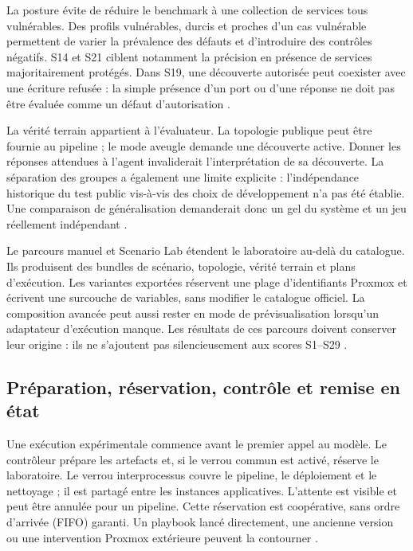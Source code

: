 \documentclass[11pt,a4paper]{article}
\begin{document}
La posture évite de réduire le benchmark à une collection de services tous
vulnérables. Des profils vulnérables, durcis et proches d'un cas vulnérable
permettent de varier la prévalence des défauts et d'introduire des contrôles
négatifs. S14 et S21 ciblent notamment la précision en présence de services
majoritairement protégés. Dans S19, une découverte autorisée peut coexister
avec une écriture refusée : la simple présence d'un port ou d'une réponse ne
doit pas être évaluée comme un défaut d'autorisation \cite{net-scenarios,net-ot}.

La vérité terrain appartient à l'évaluateur. La topologie publique peut être
fournie au pipeline ; le mode aveugle demande une découverte active. Donner
les réponses attendues à l'agent invaliderait l'interprétation de sa découverte.
La séparation des groupes a également une limite explicite : l'indépendance
historique du test public vis-à-vis des choix de développement n'a pas été
établie. Une comparaison de généralisation demanderait donc un gel du système
et un jeu réellement indépendant \cite{net-scenarios}.

Le parcours manuel et Scenario Lab étendent le laboratoire au-delà du catalogue.
Ils produisent des bundles de scénario, topologie, vérité terrain et plans
d'exécution. Les variantes exportées réservent une plage d'identifiants Proxmox
et écrivent une surcouche de variables, sans modifier le catalogue officiel.
La composition avancée peut aussi rester en mode de prévisualisation lorsqu'un
adaptateur d'exécution manque. Les résultats de ces parcours doivent conserver
leur origine : ils ne s'ajoutent pas silencieusement aux scores S1--S29
\cite{net-manual,net-generated}.

\subsection{Préparation, réservation, contrôle et remise en état}

Une exécution expérimentale commence avant le premier appel au modèle. Le
contrôleur prépare les artefacts et, si le verrou commun est activé, réserve
le laboratoire. Le verrou interprocessus couvre le pipeline, le déploiement
et le nettoyage ; il est partagé entre les instances applicatives. L'attente
est visible et peut être annulée pour un pipeline. Cette réservation est
coopérative, sans ordre d'arrivée (FIFO) garanti. Un playbook lancé directement, une
ancienne version ou une intervention Proxmox extérieure peuvent la contourner
\cite{net-instances,net-lock}.
\end{document}
